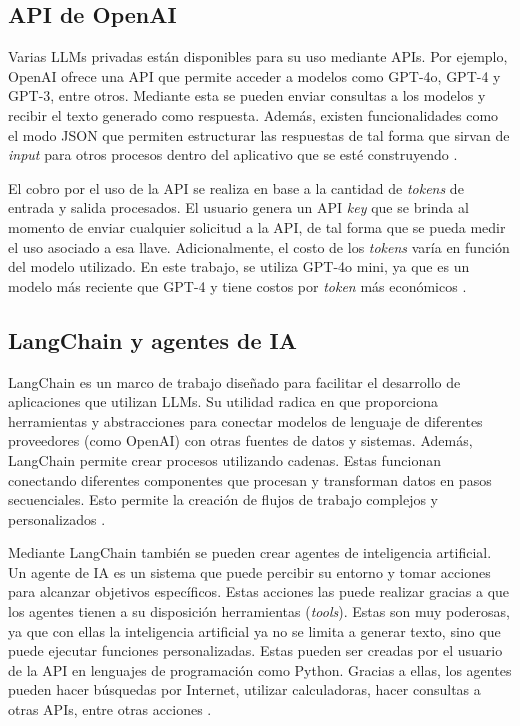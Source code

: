 \subsection{API de OpenAI}

Varias LLMs privadas están disponibles para su uso mediante APIs. Por ejemplo, OpenAI ofrece una API que permite acceder a modelos como GPT-4o, GPT-4 y GPT-3, entre otros. Mediante esta se pueden enviar consultas a los modelos y recibir el texto generado como respuesta. Además, existen funcionalidades como el modo JSON que permiten estructurar las respuestas de tal forma que sirvan de \textit{input} para otros procesos dentro del aplicativo que se esté construyendo \cite{openai}.

El cobro por el uso de la API se realiza en base a la cantidad de \textit{tokens} de entrada y salida procesados. El usuario genera un API \textit{key} que se brinda al momento de enviar cualquier solicitud a la API, de tal forma que se pueda medir el uso asociado a esa llave. Adicionalmente, el costo de los \textit{tokens} varía en función del modelo utilizado. En este trabajo, se utiliza GPT-4o mini, ya que es un modelo más reciente que GPT-4 y tiene costos por \textit{token} más económicos \cite{openai}.

\subsection{LangChain y agentes de IA}
\label{sec:LagchainAgentes}

LangChain es un marco de trabajo diseñado para facilitar el desarrollo de aplicaciones que utilizan LLMs. Su utilidad radica en que proporciona herramientas y abstracciones para conectar modelos de lenguaje de diferentes proveedores (como OpenAI) con otras fuentes de datos y sistemas. Además, LangChain permite crear procesos utilizando cadenas. Estas funcionan conectando diferentes componentes que procesan y transforman datos en pasos secuenciales. Esto permite la creación de flujos de trabajo complejos y personalizados \cite{langchain}.

Mediante LangChain también se pueden crear agentes de inteligencia artificial. Un agente de IA es un sistema que puede percibir su entorno y tomar acciones para alcanzar objetivos específicos. Estas acciones las puede realizar gracias a que los agentes tienen a su disposición herramientas (\textit{tools}). Estas son muy poderosas, ya que con ellas la inteligencia artificial ya no se limita a generar texto, sino que puede ejecutar funciones personalizadas. Estas pueden ser creadas por el usuario de la API en lenguajes de programación como Python. Gracias a ellas, los agentes pueden hacer búsquedas por Internet, utilizar calculadoras, hacer consultas a otras APIs, entre otras acciones \cite{langchain}.

